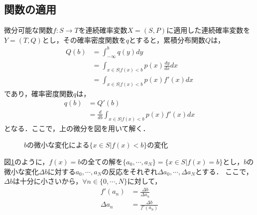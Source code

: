 \documentclass[dvipdfmx]{jsarticle}
\begin{document}
 \subsection{関数の適用}
微分可能な関数$f:S\to T$を連続確率変数$X=\left(S,P\right)$に適用した連続確率変数を$Y=\left(T,Q\right)$とし，その確率密度関数を$q$とすると，累積分布関数$Q$は，
 \begin{align}
Q\left(b\right)&=\int_{-\infty}^bq\left(y\right)dy\nonumber\\
&=\int_{x\in S|f\left(x\right)<b}p\left(x\right)\frac{dy}{dx}dx\nonumber\\
&=\int_{x\in S|f\left(x\right)<b}p\left(x\right)f'\left(x\right)dx
 \end{align}
であり，確率密度関数$q$は，
 \begin{align}
q\left(b\right)&=Q'\left(b\right)\nonumber\\
&=\frac{d}{db}\int_{x\in S|f\left(x\right)<b}p\left(x\right)f'\left(x\right)dx
 \end{align}
となる．ここで，上の微分を図を用いて解く．
 \begin{figure}
  \begin{center}
   \caption{$b$の微小な変化による$\{x\in S|f\left(x\right)<b\}$の変化}\label{IntegrationRangeChange}
  \end{center}
 \end{figure}
図\ref{IntegrationRangeChange}のように，$f\left(x\right)=b$の全ての解を$\{a_0,\cdots,a_N\}=\{x\in S|f\left(x\right)=b\}$とし，$b$の微小な変化$\Delta b$に対する$a_0,\cdots,a_N$の反応をそれぞれ$\Delta a_0,\cdots,\Delta a_N$とする．
ここで，$\Delta b$は十分に小さいから，$\forall n\in\{0,\cdots,N\}$に対して，
 \begin{align}
f'\left(a_n\right)&=\frac{\Delta b}{\Delta a_n}\nonumber\\
\Delta a_n&=\frac{\Delta b}{f'\left(a_n\right)}
 \end{align}
\end{document}
